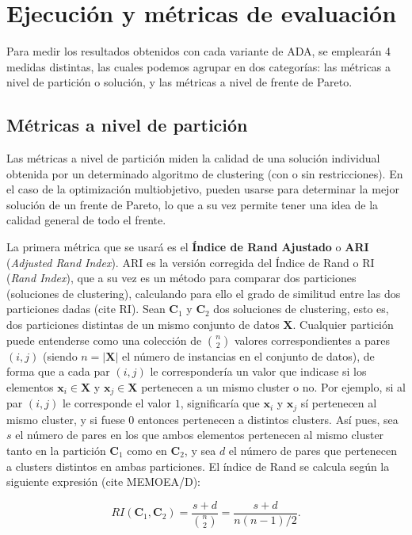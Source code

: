 \section{Ejecución y métricas de evaluación}


Para medir los resultados obtenidos con cada variante de ADA, se emplearán 4 medidas distintas, las cuales podemos agrupar en dos categorías: las métricas a nivel de partición o solución, y las métricas a nivel de frente de Pareto.

\subsection{Métricas a nivel de partición}

Las métricas a nivel de partición miden la calidad de una solución individual obtenida por un determinado algoritmo de clustering (con o sin restricciones). En el caso de la optimización multiobjetivo, pueden usarse para determinar la mejor solución de un frente de Pareto, lo que a su vez permite tener una idea de la calidad general de todo el frente.

La primera métrica que se usará es el \textbf{Índice de Rand Ajustado} o \textbf{ARI} (\emph{Adjusted Rand Index}). ARI es la versión corregida del Índice de Rand o RI (\emph{Rand Index}), que a su vez es un método para comparar dos particiones (soluciones de clustering), calculando para ello el grado de similitud entre las dos particiones dadas (cite RI). Sean $\textbf{C}_1$ y $\textbf{C}_2$ dos soluciones de clustering, esto es, dos particiones distintas de un mismo conjunto de datos $\textbf{X}$. Cualquier partición puede entenderse como una colección de $\binom{n}{2}$ valores correspondientes a pares $(i,j)$ (siendo $n=|\textbf{X}|$ el número de instancias en el conjunto de datos), de forma que a cada par $(i,j)$ le correspondería un valor que indicase si los elementos $\textbf{x}_i \in \textbf{X}$ y $\textbf{x}_j \in \textbf{X}$ pertenecen a un mismo cluster o no. Por ejemplo, si al par $(i,j)$ le corresponde el valor $1$, significaría que $\textbf{x}_i$ y $\textbf{x}_j$ sí pertenecen al mismo cluster, y si fuese $0$ entonces pertenecen a distintos clusters. Así pues, sea $s$ el número de pares en los que ambos elementos pertenecen al mismo cluster tanto en la partición $\textbf{C}_1$ como en $\textbf{C}_2$, y sea $d$ el número de pares que pertenecen a clusters distintos en ambas particiones. El índice de Rand se calcula según la siguiente expresión (cite MEMOEA/D):

\begin{equation}
	RI(\textbf{C}_1,\textbf{C}_2) = \frac{s+d}{\binom{n}{2}} = \frac{s+d}{n(n-1)/2}.
\end{equation}

